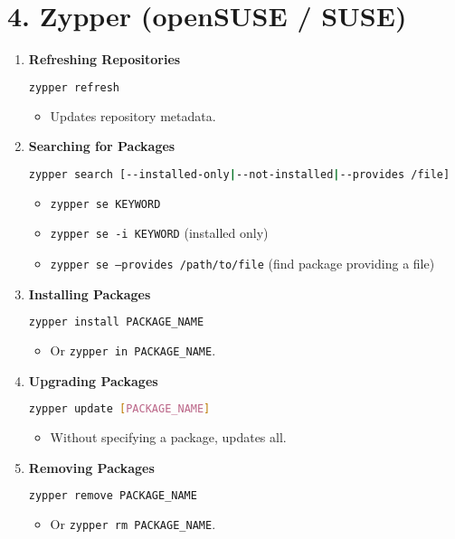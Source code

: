 \documentclass[12pt,a4paper]{report}
\begin{document}
\section*{4. Zypper (openSUSE / SUSE)}

\begin{enumerate}
    \item \textbf{Refreshing Repositories}
    \begin{lstlisting}[language=bash]
zypper refresh
    \end{lstlisting}
    \begin{itemize}
        \item Updates repository metadata.
    \end{itemize}

    \item \textbf{Searching for Packages}
    \begin{lstlisting}[language=bash]
zypper search [--installed-only|--not-installed|--provides /file]
    \end{lstlisting}
    \begin{itemize}
        \item \texttt{zypper se KEYWORD}
        \item \texttt{zypper se -i KEYWORD} (installed only)
        \item \texttt{zypper se --provides /path/to/file} (find package providing a file)
    \end{itemize}

    \item \textbf{Installing Packages}
    \begin{lstlisting}[language=bash]
zypper install PACKAGE_NAME
    \end{lstlisting}
    \begin{itemize}
        \item Or \texttt{zypper in PACKAGE\_NAME}.
    \end{itemize}

    \item \textbf{Upgrading Packages}
    \begin{lstlisting}[language=bash]
zypper update [PACKAGE_NAME]
    \end{lstlisting}
    \begin{itemize}
        \item Without specifying a package, updates all.
    \end{itemize}

    \item \textbf{Removing Packages}
    \begin{lstlisting}[language=bash]
zypper remove PACKAGE_NAME
    \end{lstlisting}
    \begin{itemize}
        \item Or \texttt{zypper rm PACKAGE\_NAME}.
    \end{itemize}


\end{enumerate}
\end{document}
